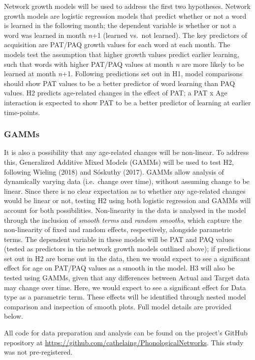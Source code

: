 \documentclass[
  man]{apa6}
\begin{document}
Network growth models will be used to address the first two hypotheses. Network growth models are logistic regression models that predict whether or not a word is learned in the following month; the dependent variable is whether or not a word was learned in month \emph{n}+1 (learned vs.~not learned). The key predictors of acquisition are PAT/PAQ growth values for each word at each month. The models test the assumption that higher growth values predict earlier learning, such that words with higher PAT/PAQ values at month \emph{n} are more likely to be learned at month \emph{n}+1. Following predictions set out in H1, model comparisons should show PAT values to be a better predictor of word learning than PAQ values. H2 predicts age-related changes in the effect of PAT; a PAT x Age interaction is expected to show PAT to be a better predictor of learning at earlier time-points.

\hypertarget{gamms}{%
\subsubsection{GAMMs}\label{gamms}}

It is also a possibility that any age-related changes will be non-linear. To address this, Generalized Additive Mixed Models (GAMMs) will be used to test H2, following Wieling (2018) and Sóskuthy (2017). GAMMs allow analysis of dynamically varying data (i.e.~change over time), without assuming change to be linear. Since there is no clear expectation as to whether any age-related changes would be linear or not, testing H2 using both logistic regression and GAMMs will account for both possibilities. Non-linearity in the data is analysed in the model through the inclusion of \emph{smooth terms} and \emph{random smooths}, which capture the non-linearity of fixed and random effects, respectively, alongside parametric terms. The dependent variable in these models will be PAT and PAQ values (tested as predictors in the network growth models outlined above); if predictions set out in H2 are borne out in the data, then we would expect to see a significant effect for age on PAT/PAQ values as a smooth in the model. H3 will also be tested using GAMMs, given that any differences between Actual and Target data may change over time. Here, we would expect to see a significant effect for Data type as a parametric term. These effects will be identified through nested model comparison and inspection of smooth plots. Full model details are provided below.

All code for data preparation and analysis can be found on the project's GitHub repository at \url{https://github.com/cathelaing/PhonologicalNetworks}. This study was not pre-registered.
\end{document}

